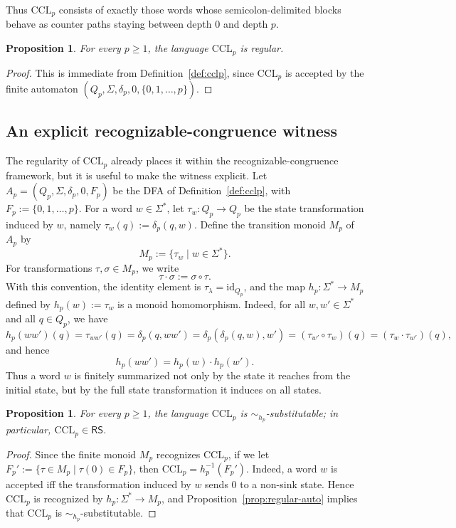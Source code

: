 \documentclass[11pt,a4paper]{article}
\newtheorem{proposition}[theorem]{Proposition}
\begin{document}
Thus $\mathrm{CCL}_p$ consists of exactly those words whose semicolon-delimited blocks behave as counter paths staying between depth $0$ and depth $p$.

\begin{proposition}\label{prop:cclp-regular}
For every $p\ge1$, the language $\mathrm{CCL}_p$ is regular.
\end{proposition}

\begin{proof}
This is immediate from Definition~\ref{def:cclp}, since $\mathrm{CCL}_p$ is accepted by the finite automaton $(Q_p,\Sigma,\delta_p,0,\{0,1,\dots,p\})$.
\end{proof}

\subsection{An explicit recognizable-congruence witness}

The regularity of $\mathrm{CCL}_p$ already places it within the
recognizable-congruence framework, but it is useful to make the witness
explicit. Let $A_p=(Q_p,\Sigma,\delta_p,0,F_p)$ be the DFA of
Definition~\ref{def:cclp}, with $F_p:=\{0,1,\dots,p\}$. For a word
$w\in\Sigma^*$, let $\tau_w:Q_p\to Q_p$ be the state transformation
induced by $w$, namely $\tau_w(q):=\delta_p(q,w)$. Define the transition
monoid $M_p$ of $A_p$ by
\[
  M_p:=\{\tau_w\mid w\in\Sigma^*\}.
\]
For transformations $\tau,\sigma\in M_p$, we write
\[
  \tau\cdot\sigma:=\sigma\circ\tau .
\]
With this convention, the identity element is
$\tau_\lambda=\mathrm{id}_{Q_p}$, and the map
$h_p:\Sigma^*\to M_p$ defined by $h_p(w):=\tau_w$ is a monoid
homomorphism. Indeed, for all $w,w'\in\Sigma^*$ and all $q\in Q_p$, we
have
\[
  h_p(ww')(q)
  =\tau_{ww'}(q)
  =\delta_p(q,ww')
  =\delta_p(\delta_p(q,w),w')
  =(\tau_{w'}\circ\tau_w)(q)
  =(\tau_w\cdot\tau_{w'})(q),
\]
and hence
\[
  h_p(ww')=h_p(w)\cdot h_p(w').
\]
Thus a word $w$ is finitely summarized not only by the state it reaches
from the initial state, but by the full state transformation it induces
on all states.

\begin{proposition}\label{prop:cclp-rs}
For every $p\ge1$, the language $\mathrm{CCL}_p$ is $\sim_{h_p}$-substitutable; in particular, $\mathrm{CCL}_p\in\mathsf{RS}$.
\end{proposition}

\begin{proof}
Since the finite monoid $M_p$ recognizes $\mathrm{CCL}_p$, if we let $F_p':=\{\tau\in M_p\mid \tau(0)\in F_p\}$, then $\mathrm{CCL}_p=h_p^{-1}(F_p')$. Indeed, a word $w$ is accepted iff the transformation induced by $w$ sends $0$ to a non-sink state. Hence $\mathrm{CCL}_p$ is recognized by $h_p:\Sigma^*\to M_p$, and Proposition~\ref{prop:regular-auto} implies that $\mathrm{CCL}_p$ is $\sim_{h_p}$-substitutable.
\end{proof}
\end{document}

